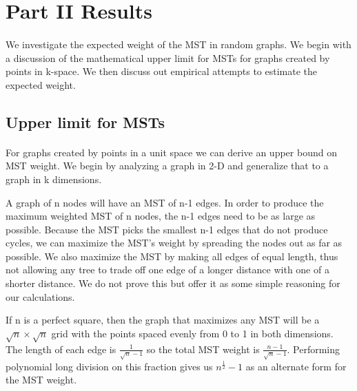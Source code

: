 \section{Part II Results}
\label{sec:part2}

\paragraph{}
We investigate the expected weight of the MST in random graphs. We begin
with a discussion of the mathematical upper limit for MSTs for graphs
created by points in k-space. We then discuss out empirical attempts to
estimate the expected weight.


\subsection{Upper limit for MSTs}
\paragraph{}
For graphs created by points in a unit space we can derive an upper bound on
MST weight. We begin by analyzing a graph in 2-D and generalize that to a
graph in k dimensions.

A graph of n nodes will have an MST of n-1 edges. In order to produce
the maximum weighted MST of n nodes, the n-1 edges need to be as large as
possible. Because the MST picks the smallest n-1 edges that do not produce
cycles, we can maximize the MST's weight by spreading the nodes out as far
as possible. We also maximize the MST by making all edges of equal length,
thus not allowing any tree to trade off one edge of a longer distance with
one of a shorter distance. We do not prove this but offer it as some
simple reasoning for our calculations.

If n is a perfect square, then the graph that
maximizes any MST will be a $\sqrt{n} \times \sqrt{n}$ grid with the
points spaced evenly from 0 to 1 in both dimensions. The length of each
edge is $\frac{1}{\sqrt{n}-1}$ so the total MST weight is
$\frac{n-1}{\sqrt{n}-1}$. Performing polynomial long division on this
fraction gives us $n^{\frac{1}{2}}-1$ as an alternate form for the MST
weight.

